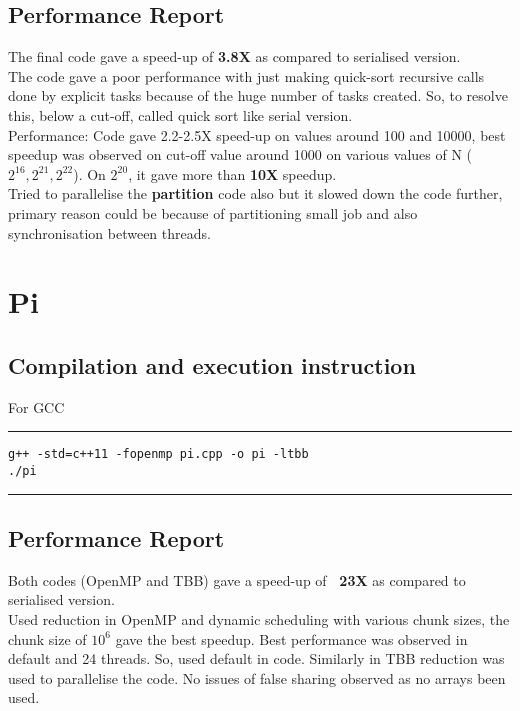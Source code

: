 \documentclass[a4paper]{article}
\begin{document}
\subsection{Performance Report}
The final code gave a speed-up of {\bf 3.8X} as compared to serialised version.\\
\newline
The code gave a poor performance with just making quick-sort recursive calls done by explicit tasks because of the huge number of tasks created. So, to resolve this, below a cut-off, called quick sort like serial version. \\
\newline
Performance: Code gave 2.2-2.5X speed-up on values around 100 and 10000, best speedup was observed on cut-off value around 1000 on various values of N (${2}^{16}, {2}^{21}, {2}^{22}$). On ${2}^{20}$, it gave more than {\bf 10X} speedup.\\
\newline
Tried to parallelise the {\bf partition} code also but it slowed down the code further, primary reason could be because of partitioning small job and also synchronisation between threads.

\section{\Huge Pi}
\vspace{0.5cm}
\subsection{Compilation and execution instruction }
\vspace{0.3cm}
For GCC
\vspace{0.2cm}
\hrule
\begin{lstlisting}
g++ -std=c++11 -fopenmp pi.cpp -o pi -ltbb
./pi
\end{lstlisting}
\hrule 
\vspace{0.5cm}

\subsection{Performance Report}
Both codes (OpenMP and TBB) gave a speed-up of {\bf ~23X} as compared to serialised version.\\
\newline
Used reduction in OpenMP and dynamic scheduling with various chunk sizes, the chunk size of ${10}^{6}$ gave the best speedup. Best performance was observed in default and 24 threads. So, used default in code. Similarly in TBB reduction was used to parallelise the code. No issues of false sharing observed as no arrays been used.
\end{document}
